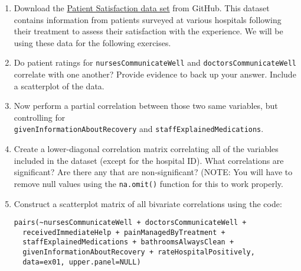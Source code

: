 \begin{enumerate}
	\item Download the \href{https://raw.githubusercontent.com/faulconbridge/appliedStats/master/LaTeX/part03/data/correlationEx01.csv}{Patient Satisfaction data set} from GitHub. This dataset contains information from patients surveyed at various hospitals following their treatment to assess their satisfaction with the experience. We will be using these data for the following exercises.
	\item Do patient ratings for \verb|nursesCommunicateWell| and \verb|doctorsCommunicateWell| correlate with one another? Provide evidence to back up your answer. Include a scatterplot of the data.
	\item Now perform a partial correlation between those two same variables, but controlling for\\\verb|givenInformationAboutRecovery| and \verb|staffExplainedMedications|.
	\item Create a lower-diagonal correlation matrix correlating all of the variables included in the dataset (except for the hospital ID). What correlations are significant? Are there any that are non-significant? (NOTE: You will have to remove null values using the \verb|na.omit()| function for this to work properly.
	\item Construct a scatterplot matrix of all bivariate correlations using the code:
	\begin{framed}
	\begin{Verbatim}[samepage=TRUE]
pairs(~nursesCommunicateWell + doctorsCommunicateWell +
  receivedImmediateHelp + painManagedByTreatment +
  staffExplainedMedications + bathroomsAlwaysClean +
  givenInformationAboutRecovery + rateHospitalPositively,
  data=ex01, upper.panel=NULL)
	\end{Verbatim}
	\end{framed}
	  

\end{enumerate}
